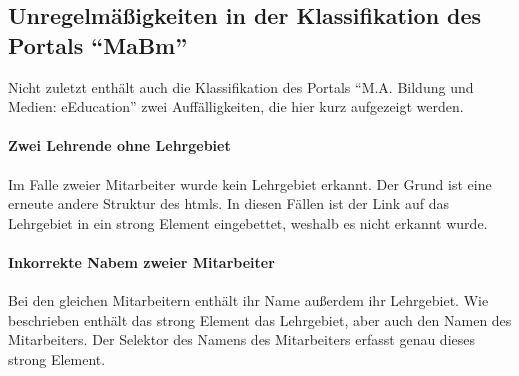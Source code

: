 \subsection{Unregelmäßigkeiten in der Klassifikation des Portals "`MaBm"'}
    Nicht zuletzt enthält auch die Klassifikation des Portals
    "`M.A. Bildung und Medien: eEducation"'
    zwei Auffälligkeiten,
    die hier kurz aufgezeigt werden.

    \paragraph{Zwei Lehrende ohne Lehrgebiet}
    Im Falle zweier Mitarbeiter wurde kein Lehrgebiet erkannt.
    Der Grund ist eine erneute andere Struktur des \glspl{html}.
    In diesen Fällen ist der Link auf das Lehrgebiet
    in ein strong Element eingebettet, weshalb es nicht erkannt wurde.

    \paragraph{Inkorrekte Nabem zweier Mitarbeiter}
    Bei den gleichen Mitarbeitern enthält ihr Name außerdem ihr Lehrgebiet.
    Wie beschrieben enthält das strong Element das Lehrgebiet,
    aber auch den Namen des Mitarbeiters.
    Der Selektor des Namens des Mitarbeiters erfasst genau dieses strong Element.
